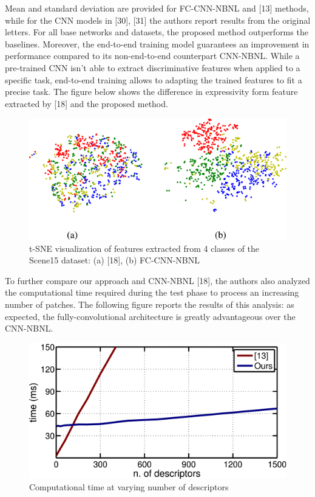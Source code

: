 Mean and standard deviation are provided for FC-CNN-NBNL and {[}13{]}
methods, while for the CNN models in {[}30{]}, {[}31{]} the authors
report results from the original letters. For all base networks and
datasets, the proposed method outperforms the baselines. Moreover, the
end-to-end training model guarantees an improvement in performance
compared to its non-end-to-end counterpart CNN-NBNL. While a pre-trained
CNN isn't able to extract discriminative features when applied to a
specific task, end-to-end training allows to adapting the trained
features to fit a precise task. The figure below shows the difference in
expressivity form feature extracted by {[}18{]} and the proposed method.

\begin{figure}[h!]
\centering
\includegraphics[width=0.8\linewidth]{images/tsneNBNL.png}
\caption{t-SNE visualization of features extracted from 4 classes of the Scene15 dataset: (a) [18], (b) FC-CNN-NBNL}
\end{figure}

To further compare our approach and CNN-NBNL {[}18{]}, the authors also
analyzed the computational time required during the test phase to
process an increasing number of patches. The following figure reports
the results of this analysis: as expected, the fully-convolutional
architecture is greatly advantageous over the CNN-NBNL.

\begin{figure}[h!]
\centering
\includegraphics[width=0.7\linewidth]{images/NBNLtime.png}
\caption{Computational time at varying number of descriptors}
\end{figure}

